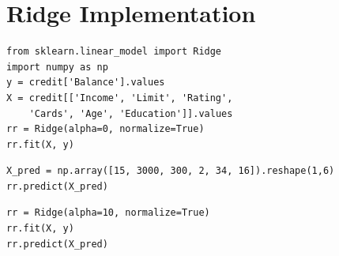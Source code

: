 


\section{Ridge Implementation}
\begin{frame}[fragile]
\tiny
\begin{lstlisting}
from sklearn.linear_model import Ridge
import numpy as np
y = credit['Balance'].values
X = credit[['Income', 'Limit', 'Rating', 
	'Cards', 'Age', 'Education']].values
rr = Ridge(alpha=0, normalize=True)
rr.fit(X, y) 
\end{lstlisting}
\pause
\begin{lstlisting}
X_pred = np.array([15, 3000, 300, 2, 34, 16]).reshape(1,6)
rr.predict(X_pred)
\end{lstlisting}
\pause
\begin{lstlisting}
rr = Ridge(alpha=10, normalize=True)
rr.fit(X, y) 
rr.predict(X_pred)
\end{lstlisting}


\end{frame}


